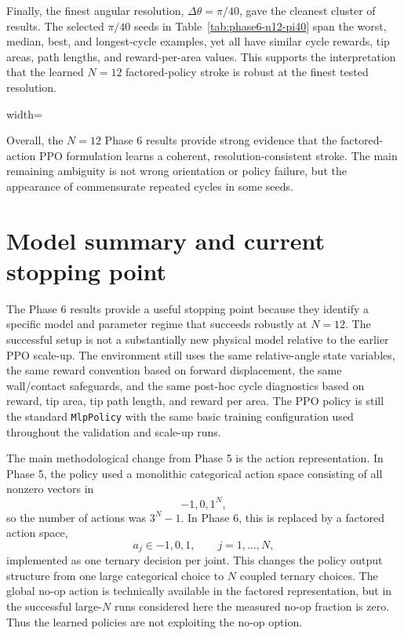 \documentclass[11pt]{article}
\begin{document}
Finally, the finest angular resolution, $\Delta\theta=\pi/40$, gave the
cleanest cluster of results.  The selected $\pi/40$ seeds in
Table~\ref{tab:phase6-n12-pi40} span the worst, median, best, and longest-cycle
examples, yet all have similar cycle rewards, tip areas, path lengths, and
reward-per-area values.  This supports the interpretation that the learned
$N=12$ factored-policy stroke is robust at the finest tested resolution.

\begin{table}[htbp]
    \centering
    \small
    \caption{
    Selected $\Delta\theta=\pi/40$ seeds illustrating robustness of the
    learned $N=12$ factored-policy stroke.
    }
    \label{tab:phase6-n12-pi40}
    \begin{adjustbox}{width=\textwidth}
    
    \end{adjustbox}
\end{table}

Overall, the $N=12$ Phase 6 results provide strong evidence that the
factored-action PPO formulation learns a coherent, resolution-consistent
stroke.  The main remaining ambiguity is not wrong orientation or policy
failure, but the appearance of commensurate repeated cycles in some seeds.

\section{Model summary and current stopping point}

The Phase 6 results provide a useful stopping point because they identify a specific model and parameter regime that succeeds robustly at $N=12$.  The successful setup is not a substantially new physical model relative to the earlier PPO scale-up.  The environment still uses the same relative-angle state variables, the same reward convention based on forward displacement, the same wall/contact safeguards, and the same post-hoc cycle diagnostics based on reward, tip area, tip path length, and reward per area.  The PPO policy is still the standard \texttt{MlpPolicy} with the same basic training configuration used throughout the validation and scale-up runs.

The main methodological change from Phase 5 is the action representation.  In Phase 5, the policy used a monolithic categorical action space consisting of all nonzero vectors in
\[
{-1,0,1}^N,
\]
so the number of actions was $3^N-1$.  In Phase 6, this is replaced by a factored action space,
\[
a_j \in {-1,0,1}, \qquad j=1,\ldots,N,
\]
implemented as one ternary decision per joint.  This changes the policy output structure from one large categorical choice to $N$ coupled ternary choices.  The global no-op action is technically available in the factored representation, but in the successful large-$N$ runs considered here the measured no-op fraction is zero.  Thus the learned policies are not exploiting the no-op option.
\end{document}
